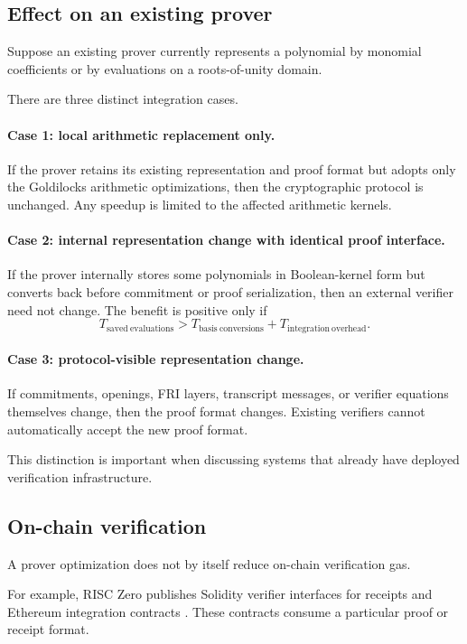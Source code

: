 \subsection{Effect on an existing prover}

Suppose an existing prover currently represents a polynomial by monomial
coefficients or by evaluations on a roots-of-unity domain.

There are three distinct integration cases.

\paragraph{Case 1: local arithmetic replacement only.}
If the prover retains its existing representation and proof format but
adopts only the Goldilocks arithmetic optimizations, then the cryptographic
protocol is unchanged.  Any speedup is limited to the affected arithmetic
kernels.

\paragraph{Case 2: internal representation change with identical proof
interface.}
If the prover internally stores some polynomials in Boolean-kernel form but
converts back before commitment or proof serialization, then an external
verifier need not change.  The benefit is positive only if
\[
T_{\mathrm{saved\ evaluations}}
>
T_{\mathrm{basis\ conversions}}
+
T_{\mathrm{integration\ overhead}}.
\]

\paragraph{Case 3: protocol-visible representation change.}
If commitments, openings, FRI layers, transcript messages, or verifier
equations themselves change, then the proof format changes.  Existing
verifiers cannot automatically accept the new proof format.

This distinction is important when discussing systems that already have
deployed verification infrastructure.

\subsection{On-chain verification}

A prover optimization does not by itself reduce on-chain verification gas.

For example, RISC Zero publishes Solidity verifier interfaces for receipts
and Ethereum integration contracts \cite{risc0ethverifier}.  These contracts
consume a particular proof or receipt format.

